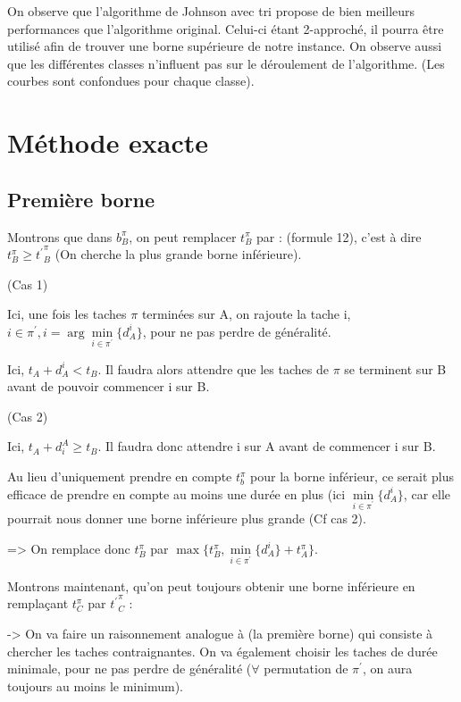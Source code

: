 \documentclass[12pt]{article}
\begin{document}
On observe que l'algorithme de Johnson avec tri propose de bien meilleurs performances que l'algorithme original.
Celui-ci étant 2-approché, il pourra être utilisé afin de trouver une borne supérieure de notre instance.
On observe aussi que les différentes classes n'influent pas sur le déroulement de l'algorithme. (Les courbes sont confondues pour chaque classe).

\clearpage
\newpage
\section{Méthode exacte}

\subsection{Première borne}

Montrons que dans $b_B^\pi$, on peut remplacer $t_B^\pi$ par :
(formule 12), c'est à dire $t_B^\pi \ge {t^\prime}_B^\pi$ (On cherche la plus grande borne inférieure).

(Cas 1)

Ici, une fois les taches $\pi$ terminées sur A, on rajoute la tache i, $i\in{\pi}^\prime,i = {\arg\min\limits_{i\in{\pi^\prime}}}\{d_A^i\}$, pour ne pas perdre de généralité.

Ici, $t_A + d_A^i < t_B$. Il faudra alors attendre que les taches de $\pi$ se terminent sur B avant de pouvoir commencer i sur B.

(Cas 2)

Ici, $t_A + d_i^A \ge t_B$. Il faudra donc attendre i sur A avant de commencer i sur B.

Au lieu d'uniquement prendre en compte $t_b^\pi$ pour la borne inférieur, ce serait plus efficace de prendre en compte au moins une durée en plus (ici $\min\limits_{i\in{\pi^\prime}}\{d_A^i\}$, car elle pourrait nous donner une borne inférieure plus grande (Cf cas 2).

=> On remplace donc $t_B^\pi$ par $\max\{t_B^\pi,\min\limits_{i\in{\pi^\prime}}\{d_A^i\}+t_A^\pi\}$.


Montrons maintenant, qu'on peut toujours obtenir une borne inférieure en remplaçant $t_C^\pi$ par ${t^\prime}_C^\pi$ :

-> On va faire un raisonnement analogue à (la première borne) qui consiste à chercher les taches contraignantes. On va également choisir les taches de durée minimale, pour ne pas perdre de généralité ($\forall$ permutation de $\pi^\prime$, on aura toujours au moins le minimum).
\end{document}
